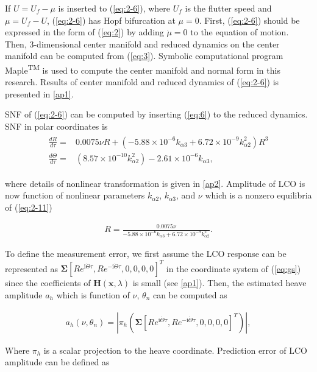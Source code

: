 \documentclass[openacc]{rsproca_new}%
\def\vec#1{\ensuremath{\mathbf{#1}}}
\newcommand{\Eref}[1]{(\ref{#1})}
\begin{document}
If $U=U_f-\mu$ is inserted to \Eref{eq:2-6}, where $U_f$ is the flutter speed and $\mu=U_f-U$, \Eref{eq:2-6} has Hopf bifurcation at $\mu=0$. First, \Eref{eq:2-6} should be expressed in the form of \Eref{eq:2} by adding $\dot \mu=0$ to the equation of motion. Then, 3-dimensional center manifold and reduced dynamics on the center manifold can be computed from \Eref{eq:3}. Symbolic computational program Maple\textsuperscript{TM} \cite{char1986tutorial} is used to compute the center manifold and normal form in this research. Results of center manifold and reduced dynamics of \Eref{eq:2-6} is presented in \ref{ap1}.

SNF of \Eref{eq:2-6} can be computed by inserting \Eref{eq:6} to the reduced dynamics. SNF in polar coordinates is
\begin{align}\label{eq:2-11}
\begin{split}
\frac{dR}{d\tau}=&0.0075\nu R+(- 5.88 \times 10^{-6}  k_{\alpha 3} + 6.72 \times 10^{-9} k_{\alpha 2}^2)R^3\\
\frac{d\Theta}{d\tau}=&(8.57 \times 10^{-10}  k_{\alpha 2}^2) - 2.61 \times 10^{-6}k_{\alpha 3},
\end{split}
\end{align}

\noindent where details of nonlinear transformation is given in \ref{ap2}. Amplitude of LCO is now function of nonlinear parameters $k_{\alpha2}$, $k_{\alpha3}$, and $\nu$ which is a nonzero equilibria of \Eref{eq:2-11}

\begin{align}\label{eq:2-12}
R=\frac{0.0075\nu}{- 5.88 \times 10^{-6}  k_{\alpha 3} + 6.72 \times 10^{-9} k_{\alpha 2}^2}.
\end{align}

\noindent To define the measurement error, we first assume the LCO response can be represented as $\vec{\Sigma}[Re^{\textrm{i}\dot \Theta \tau},Re^{-\textrm{i}\dot \Theta \tau},0,0,0,0]^T$ in the coordinate system of \Eref{eq:gs} since the coefficients of $\vec{H}(\vec{x},\lambda)$ is small (see \ref{ap1}). Then, the estimated heave amplitude $a_h$ which is function of $\nu$, $\theta_n$ can be computed as

\begin{align}\label{eq:2-h}
a_h(\nu,\theta_n)=|\pi_h (\vec{\Sigma}[Re^{\textrm{i}\dot \Theta \tau},Re^{-\textrm{i}\dot \Theta \tau},0,0,0,0]^T)|,
\end{align}


\noindent Where $\pi_h$ is a scalar projection to the heave coordinate. Prediction error of LCO amplitude can be defined as
\end{document}
